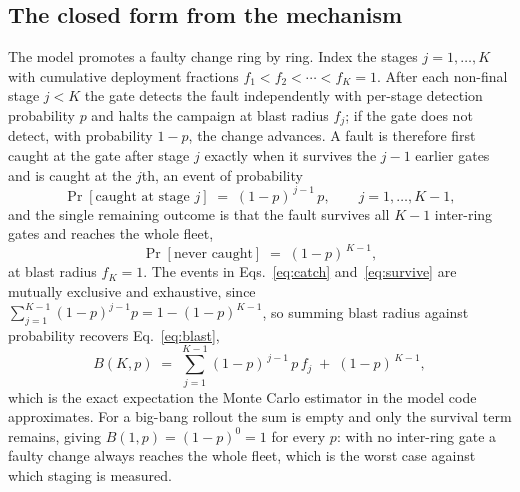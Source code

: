 \documentclass[journal]{IEEEtran}
\begin{document}
\subsection{The closed form from the mechanism}
The model promotes a faulty change ring by ring. Index the stages $j = 1, \ldots, K$ with cumulative
deployment fractions $f_1 < f_2 < \cdots < f_K = 1$. After each non-final stage $j < K$ the gate
detects the fault independently with per-stage detection probability $p$ and halts the campaign at
blast radius $f_j$; if the gate does not detect, with probability $1-p$, the change advances. A
fault is therefore first caught at the gate after stage $j$ exactly when it survives the $j-1$
earlier gates and is caught at the $j$th, an event of probability
\begin{equation}
\Pr[\text{caught at stage } j] \;=\; (1-p)^{\,j-1}\, p,
\qquad j = 1, \ldots, K-1,
\label{eq:catch}
\end{equation}
and the single remaining outcome is that the fault survives all $K-1$ inter-ring gates and reaches
the whole fleet,
\begin{equation}
\Pr[\text{never caught}] \;=\; (1-p)^{\,K-1},
\label{eq:survive}
\end{equation}
at blast radius $f_K = 1$. The events in Eqs.~\eqref{eq:catch} and~\eqref{eq:survive} are mutually
exclusive and exhaustive, since $\sum_{j=1}^{K-1}(1-p)^{j-1}p = 1 - (1-p)^{K-1}$, so summing blast
radius against probability recovers Eq.~\eqref{eq:blast},
\begin{equation}
B(K, p) \;=\; \sum_{j=1}^{K-1} (1-p)^{\,j-1}\, p\, f_j \;+\; (1-p)^{\,K-1},
\label{eq:blast2}
\end{equation}
which is the exact expectation the Monte Carlo estimator in the model code approximates. For a
big-bang rollout the sum is empty and only the survival term remains, giving $B(1, p) = (1-p)^{0} = 1$
for every $p$: with no inter-ring gate a faulty change always reaches the whole fleet, which is the
worst case against which staging is measured.
\end{document}
